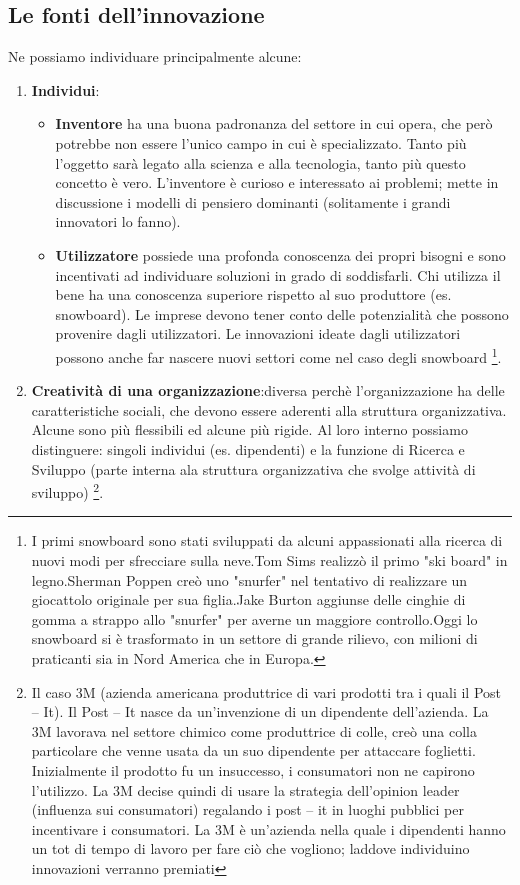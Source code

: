 \documentclass{article}
\begin{document}
\subsection{Le fonti dell'innovazione}
Ne possiamo individuare principalmente alcune:
\begin{enumerate}
	\item \textbf{Individui}:
	\begin{itemize}
		\item \textbf{Inventore} ha una buona padronanza del settore in cui opera, che però potrebbe non
		essere l’unico campo in cui è specializzato. Tanto più l’oggetto sarà legato alla scienza e alla
		tecnologia, tanto più questo concetto è vero. L’inventore è curioso e interessato ai
		problemi; mette in discussione i modelli di pensiero dominanti (solitamente i grandi
		innovatori lo fanno).
		\item \textbf{Utilizzatore} possiede una profonda conoscenza dei propri bisogni e sono incentivati ad
		individuare soluzioni in grado di soddisfarli. Chi utilizza il bene ha
		una conoscenza superiore rispetto al suo produttore (es. snowboard). Le imprese devono
		tener conto delle potenzialità che possono provenire dagli utilizzatori.
		Le innovazioni ideate dagli utilizzatori possono anche far nascere nuovi settori come nel
		caso degli snowboard \footnote{I primi snowboard sono stati sviluppati da alcuni appassionati alla ricerca di nuovi  modi per sfrecciare sulla neve.Tom Sims realizzò il primo "ski board" in legno.Sherman Poppen creò uno "snurfer" nel tentativo di realizzare un giocattolo originale per sua figlia.Jake Burton aggiunse delle cinghie di gomma a strappo allo "snurfer" per averne un maggiore controllo.Oggi lo snowboard si è trasformato in un settore di grande rilievo, con milioni di praticanti sia in Nord America che in Europa.}.
	\end{itemize} 
	\item \textbf{Creatività di una organizzazione}:diversa perchè l'organizzazione ha delle caratteristiche sociali, che devono essere aderenti alla struttura organizzativa. Alcune sono più flessibili ed alcune più rigide.
	Al loro interno possiamo distinguere: singoli individui (es. dipendenti) e la funzione di
	Ricerca e Sviluppo (parte interna ala struttura organizzativa che svolge attività di sviluppo) \footnote{Il caso 3M (azienda americana produttrice di vari prodotti tra i quali il Post – It). Il Post – It
		nasce da un’invenzione di un dipendente dell’azienda. La 3M lavorava nel settore chimico
		come produttrice di colle, creò una colla particolare che venne usata da un suo dipendente
		per attaccare foglietti. Inizialmente il prodotto fu un insuccesso, i consumatori non ne
		capirono l’utilizzo. La 3M decise quindi di usare la strategia dell’opinion leader (influenza
		sui consumatori) regalando i post – it in luoghi pubblici per incentivare i consumatori. La
		3M è un’azienda nella quale i dipendenti hanno un tot di tempo di lavoro per fare ciò che
		vogliono; laddove individuino innovazioni verranno premiati}.
	

\end{enumerate}
\end{document}
